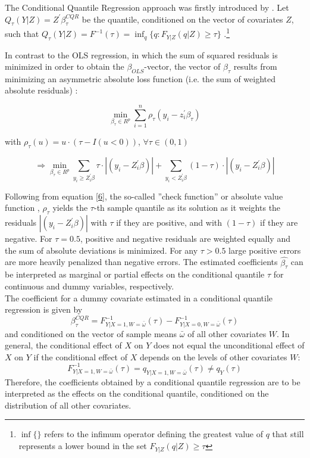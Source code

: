 The Conditional Quantile Regression approach was firstly introduced by \cite{Koenker&Bassett:1978}. Let $Q_{\tau}(Y|Z) = Z^{'}\beta_{\tau}^{CQR}$ be the quantile, conditioned on the vector of covariates $Z$, such that $Q_{\tau}(Y|Z)=F^{-1}(\tau)=\inf_{q}\{q:F_{Y|Z}(q|Z)\geq\tau\}$ \citep{Borah&Basu:2013}.\footnote{ $\inf\{\}$ refers to the infimum operator defining the greatest value of $q$ that still represents a lower bound in the set $F_{Y|Z}(q|Z)\geq\tau$}

In contrast to the OLS regression, in which the sum of squared residuals is minimized in order to obtain the $\beta_{OLS}$-vector, the vector of $\beta_{\tau}$ results from minimizing an asymmetric absolute loss function (i.e. the sum of weighted absolute residuals) \citep{Koenker&Bassett:1978}:

\begin{equation}\label{5}
  \min_{\beta_{\tau}\in R^{p}}\sum_{i=1}^n \rho_{\tau}(y_{i}-z_{i}^{'}\beta_{\tau})
\end{equation}
\begin{center}
with $\rho_{\tau}(u)=u\cdot (\tau-I(u<0))$, $\forall \tau \in (0,1)$
\end{center}
\begin{equation}\label{6}
  \Longrightarrow \min_{\beta_{\tau}\in R^{p}}\sum_{y_{i}\geq Z_{i}^{'}\beta}\tau \cdot \left| (y_{i}-Z_{i}^{'}\beta) \right| + \sum_{y_{i} < Z_{i}^{'}\beta}(1-\tau) \cdot \left| (y_{i}-Z_{i}^{'}\beta) \right|
\end{equation}

Following from equation \ref{6}, the so-called ''check function'' or absolute value function \citep{Koenker&Hallock:2001}, $\rho_{\tau}$ yields the $\tau$-th sample quantile as its solution as it weights the residuals $\left| (y_{i}-Z_{i}^{'}\beta) \right|$ with $\tau$ if they are positive, and with $(1-\tau)$ if they are negative. For $\tau=0.5$, positive and negative residuals are weighted equally and the sum of absolute deviations is minimized. For any $\tau > 0.5$ large positive errors are more heavily penalized than negative errors. The estimated coefficients $\hat{\beta_{\tau}}$ can be interpreted as marginal or partial effects on the conditional quantile $\tau$ for continuous and dummy variables, respectively.\\
The coefficient for a dummy covariate estimated in a conditional quantile regression is given by
\begin{equation}\label{7}
  \beta_{\tau}^{CQR}=F_{Y|X=1 , W=\bar{\omega}}^{-1}(\tau) - F_{Y|X=0 , W=\bar{\omega}}^{-1}(\tau)
\end{equation}
and conditioned on the vector of sample means $\bar{\omega}$ of all other covariates $W$. In general, the conditional effect of $X$ on $Y$ does not equal the unconditional effect of $X$ on $Y$ if the conditional effect of $X$ depends on the levels of other covariates $W$:
\begin{equation*}
  F_{Y|X=1 , W=\bar{\omega}}^{-1}(\tau)=q_{Y|X=1 , W=\bar{\omega}}(\tau) \neq q_{Y}(\tau)
\end{equation*}
Therefore, the coefficients obtained by a conditional quantile regression are to be interpreted as the effects on the conditional quantile, conditioned on the distribution of all other covariates.

